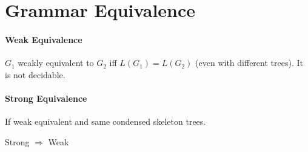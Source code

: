 \section{Grammar Equivalence}

\paragraph{Weak Equivalence} $G_1$ weakly equivalent to $G_2$ iff $L(G_1) = L(G_2)$ (even with different trees). It is not decidable.

\paragraph{Strong Equivalence} If weak equivalent and same condensed skeleton trees.

Strong $\Rightarrow$ Weak
